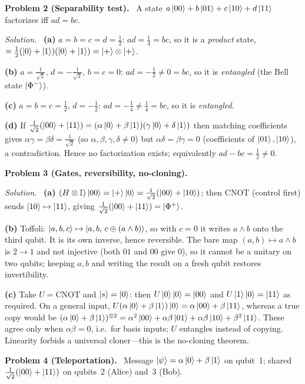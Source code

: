 \documentclass[11pt]{article}
\newcommand{\id}{\mathbb{I}}
\newcommand{\CNOT}{\mathrm{CNOT}}
\newcommand{\sol}{\smallskip\noindent\textit{Solution.}\ }
\newcommand{\problem}[1]{\bigskip\noindent\textbf{Problem #1.}\ }
\begin{document}
\problem{2 (Separability test)}
A state $a\ket{00}+b\ket{01}+c\ket{10}+d\ket{11}$ factorizes iff $ad=bc$.

\sol
\textbf{(a)} $a=b=c=d=\tfrac12$: $ad=\tfrac14=bc$, so it is a \emph{product} state,
$=\tfrac12(\ket0+\ket1)(\ket0+\ket1)=\ket{+}\otimes\ket{+}$.

\textbf{(b)} $a=\tfrac1{\sqrt2},\,d=-\tfrac1{\sqrt2},\,b=c=0$: $ad=-\tfrac12\neq0=bc$,
so it is \emph{entangled} (the Bell state $\ket{\Phi^-}$).

\textbf{(c)} $a=b=c=\tfrac12,\,d=-\tfrac12$: $ad=-\tfrac14\neq\tfrac14=bc$, so it is
\emph{entangled}.

\textbf{(d)} If $\tfrac1{\sqrt2}(\ket{00}+\ket{11})=(\alpha\ket0+\beta\ket1)
(\gamma\ket0+\delta\ket1)$ then matching coefficients gives
$\alpha\gamma=\beta\delta=\tfrac1{\sqrt2}$ (so $\alpha,\beta,\gamma,\delta\neq0$) but
$\alpha\delta=\beta\gamma=0$ (coefficients of $\ket{01},\ket{10}$), a contradiction.
Hence no factorization exists; equivalently $ad-bc=\tfrac12\neq0$.

\problem{3 (Gates, reversibility, no-cloning)}

\sol
\textbf{(a)} $(H\otimes\id)\ket{00}=\ket{+}\ket0=\tfrac1{\sqrt2}(\ket{00}+\ket{10})$;
then $\CNOT$ (control first) sends $\ket{10}\mapsto\ket{11}$, giving
$\tfrac1{\sqrt2}(\ket{00}+\ket{11})=\ket{\Phi^+}$.

\textbf{(b)} Toffoli: $\ket{a,b,c}\mapsto\ket{a,b,\,c\oplus(a\wedge b)}$, so with
$c=0$ it writes $a\wedge b$ onto the third qubit. It is its own inverse, hence
reversible. The bare map $(a,b)\mapsto a\wedge b$ is $2\to1$ and not injective (both
$01$ and $00$ give $0$), so it cannot be a unitary on two qubits; keeping $a,b$ and
writing the result on a fresh qubit restores invertibility.

\textbf{(c)} Take $U=\CNOT$ and $\ket{s}=\ket0$: then $U\ket0\ket0=\ket{00}$ and
$U\ket1\ket0=\ket{11}$ as required. On a general input,
$U(\alpha\ket0+\beta\ket1)\ket0=\alpha\ket{00}+\beta\ket{11}$, whereas a true copy
would be $(\alpha\ket0+\beta\ket1)^{\otimes2}
=\alpha^2\ket{00}+\alpha\beta\ket{01}+\alpha\beta\ket{10}+\beta^2\ket{11}$. These
agree only when $\alpha\beta=0$, i.e.\ for basis inputs; $U$ entangles instead of
copying. Linearity forbids a universal cloner---this is the no-cloning theorem.

\problem{4 (Teleportation)}
Message $\ket\psi=\alpha\ket0+\beta\ket1$ on qubit~1; shared
$\tfrac1{\sqrt2}(\ket{00}+\ket{11})$ on qubits~2 (Alice) and~3 (Bob).
\end{document}
